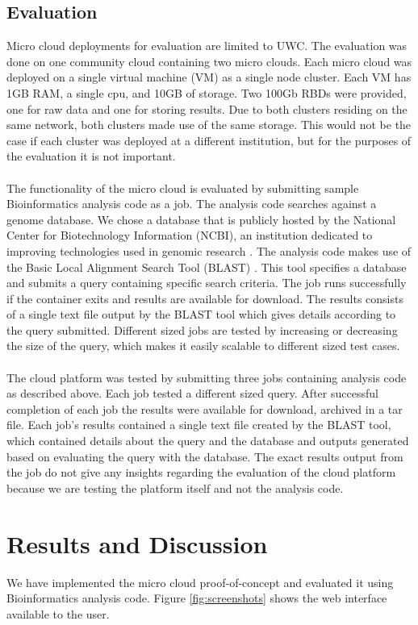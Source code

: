 \documentclass{sig-alternate-05-2015}
\begin{document}
\subsection{Evaluation}
Micro cloud deployments for evaluation are limited to UWC. The evaluation was done on one community cloud containing two micro clouds. Each micro cloud was deployed on a single virtual machine (VM) as a single node cluster. Each VM has 1GB RAM, a single cpu, and 10GB of storage. Two 100Gb RBDs were provided, one for raw data and one for storing results. Due to both clusters residing on the same network, both clusters made use of the same storage. This would not be the case if each cluster was deployed at a different institution, but for the purposes of the evaluation it is not important.
\\\\
The functionality of the micro cloud is evaluated by submitting sample Bioinformatics analysis code as a job. The analysis code searches against a genome database. We chose a database that is publicly hosted by the National Center for Biotechnology Information (NCBI), an institution dedicated to improving technologies used in genomic research \cite{pruitt2005ncbi}. The analysis code makes use of the Basic Local Alignment Search Tool (BLAST) \cite{camacho2009blast}. This tool specifies a database and submits a query containing specific search criteria. The job runs successfully if the container exits and results are available for download. The results consists of a single text file output by the BLAST tool which gives details according to the query submitted. Different sized jobs are tested by increasing or decreasing the size of the query, which makes it easily scalable to different sized test cases.
\\\\
The cloud platform was tested by submitting three jobs containing analysis code as described above. Each job tested a different sized query. After successful completion of each job the results were available for download, archived in a tar file. Each job's results contained a single text file created by the BLAST tool, which contained details about the query and the database and outputs generated based on evaluating the query with the database. The exact results output from the job do not give any insights regarding the evaluation of the cloud platform because we are testing the platform itself and not the analysis code. 


\section{Results and Discussion}
We have implemented the micro cloud proof-of-concept and evaluated it using Bioinformatics analysis code. Figure \ref{fig:screenshots} shows the web interface available to the user. 
\end{document}
